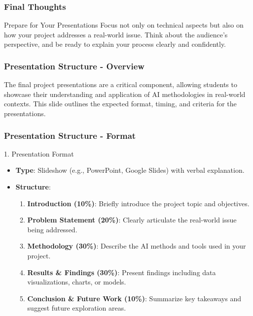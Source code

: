 \documentclass[aspectratio=169]{beamer}
\begin{document}
\begin{frame}[fragile]
    \frametitle{Final Thoughts}
    \begin{block}{Prepare for Your Presentations}
        Focus not only on technical aspects but also on how your project addresses a real-world issue. Think about the audience's perspective, and be ready to explain your process clearly and confidently.
    \end{block}
\end{frame}

\begin{frame}[fragile]
    \frametitle{Presentation Structure - Overview}
    The final project presentations are a critical component, allowing students to showcase their understanding and application of AI methodologies in real-world contexts. This slide outlines the expected format, timing, and criteria for the presentations.
\end{frame}

\begin{frame}[fragile]
    \frametitle{Presentation Structure - Format}
    \begin{block}{1. Presentation Format}
        \begin{itemize}
            \item \textbf{Type}: Slideshow (e.g., PowerPoint, Google Slides) with verbal explanation.
            \item \textbf{Structure}:
                \begin{enumerate}
                    \item \textbf{Introduction (10\%)}: Briefly introduce the project topic and objectives.
                    \item \textbf{Problem Statement (20\%)}: Clearly articulate the real-world issue being addressed.
                    \item \textbf{Methodology (30\%)}: Describe the AI methods and tools used in your project.
                    \item \textbf{Results \& Findings (30\%)}: Present findings including data visualizations, charts, or models.
                    \item \textbf{Conclusion \& Future Work (10\%)}: Summarize key takeaways and suggest future exploration areas.
                \end{enumerate}
        \end{itemize}
    \end{block}
\end{frame}
\end{document}
